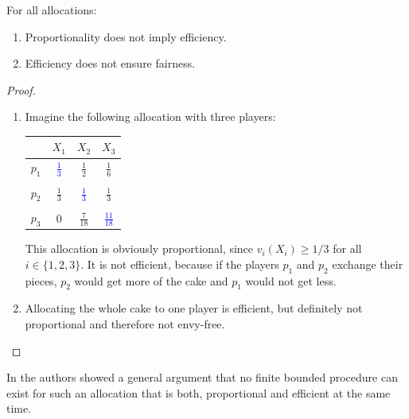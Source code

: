 \begin{lem}
For all allocations:
	\begin{enumerate}
		\item Proportionality does not imply efficiency.
		\item Efficiency does not ensure fairness.
	\end{enumerate}
\end{lem}

\begin{proof}
	\begin{enumerate}
		\item Imagine the following allocation with three players:
		\begin{center}
		\begin{tabular}{c|ccc}
		& $X_1$& $X_2$& $X_3$\\
		\hline
		$p_1$ & \textcolor{blue}{$\frac{1}{3}$} & $\frac{1}{2}$ & $\frac{1}{6}$\\ \\
  $p_2$ & $\frac{1}{3}$ & \textcolor{blue}{$\frac{1}{3}$} & $\frac{1}{3}$\\ \\
  $p_3$ & $0$ & $\frac{7}{18}$ & \textcolor{blue}{$\frac{11}{18}$}
 		\end{tabular}	 
 		\end{center}
		
		This allocation is obviously proportional, since $v_i(X_i) \geq 1/3$ for all $i \in \{1,2,3\}$. It is not efficient, because if the players $p_1$ and $p_2$ exchange their pieces, $p_2$ would get more of the cake and $p_1$ would not get less.
		\item Allocating the whole cake to one player is efficient, but definitely not proportional and therefore not envy-free.
	\end{enumerate}
\end{proof}
In \cite{brams2} the authors showed a general argument that no finite bounded procedure can exist for such an allocation that is both, proportional and efficient at the same time.
